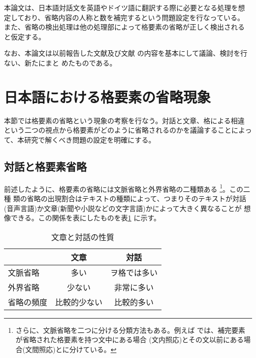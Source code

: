 本論文は、日本語対話文を英語やドイツ語に翻訳する際に必要となる処理を想
定しており、省略内容の人称と数を補完するという問題設定を行なっている。
また、省略の検出処理は他の処理部によって格要素の省略が正しく検出される
と仮定する。

なお、本論文は以前報告した文献\cite{NLPRS97}及び文献
{}\cite{Coling-ACL98}の内容を基本にして議論、検討を行ない、新たにまと
めたものである。



\section{日本語における格要素の省略現象}
\label{節:現象}

本節では格要素の省略という現象の考察を行なう。対話と文章、格による相違
という二つの視点から格要素がどのように省略されるのかを議論することによっ
て、本研究で解くべき問題の設定を明確にする。


\subsection{対話と格要素省略}

前述したように、格要素の省略には文脈省略と外界省略の二種類ある
{}\footnote{さらに、文脈省略を二つに分ける分類方法もある。例えば
{}\cite{Nakaiwa}では、補完要素が省略された格要素を持つ文中にある場合
(文内照応)とその文以前にある場合(文間照応)とに分けている。}。この二種
類の省略の出現割合はテキストの種類によって、つまりそのテキストが対話
(音声言語)か文章(新聞や小説などの文字言語)かによって大きく異なることが
想像できる。この関係を表にしたものを表\ref{文章と対話} に示す。


\begin{table}
\begin{center}
\caption{文章と対話の性質}
\label{文章と対話}
\begin{tabular}{l|cc}
\hline\hline
           & 文章        & 対話 \\
\hline
文脈省略 & 多い          & ヲ格では多い \\
外界省略 & 少ない        & 非常に多い \\
\hline
省略の頻度 & 比較的少ない  & 比較的多い \\
\hline
\end{tabular}
\end{center}
\end{table}

